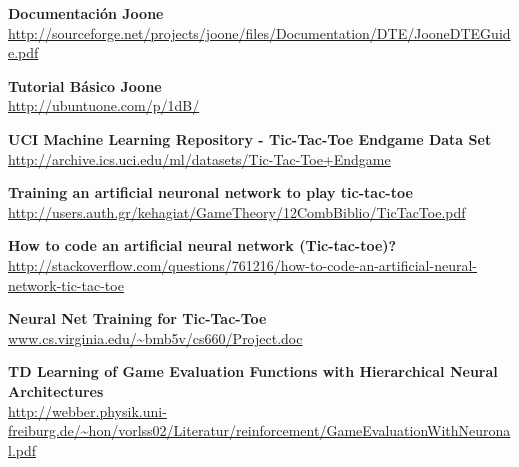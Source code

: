 \documentclass[12pt,titlepage]{article}
\begin{document}

\newpage
\begin{thebibliography}{99}
		\textbf{Documentaci\'on Joone} \\
		\url{http://sourceforge.net/projects/joone/files/Documentation/DTE/JooneDTEGuide.pdf}

		\textbf{Tutorial B\'asico Joone} \\
		\url{http://ubuntuone.com/p/1dB/}

		\textbf{UCI Machine Learning Repository - Tic-Tac-Toe Endgame Data Set} \\
		\url{http://archive.ics.uci.edu/ml/datasets/Tic-Tac-Toe+Endgame}

		\textbf{Training an artificial neuronal network to play tic-tac-toe} \\
		\url{http://users.auth.gr/kehagiat/GameTheory/12CombBiblio/TicTacToe.pdf}

		\textbf{How to code an artificial neural network (Tic-tac-toe)?} \\
		{\url{http://stackoverflow.com/questions/761216/how-to-code-an-artificial-neural-network-tic-tac-toe}}

		\textbf{Neural Net Training for Tic-Tac-Toe} \\
		\url{www.cs.virginia.edu/~bmb5v/cs660/Project.doc}

		\textbf{TD Learning of Game Evaluation Functions with Hierarchical Neural Architectures} \\
		\url{http://webber.physik.uni-freiburg.de/~hon/vorlss02/Literatur/reinforcement/GameEvaluationWithNeuronal.pdf}

\end{thebibliography}


\end{document}
